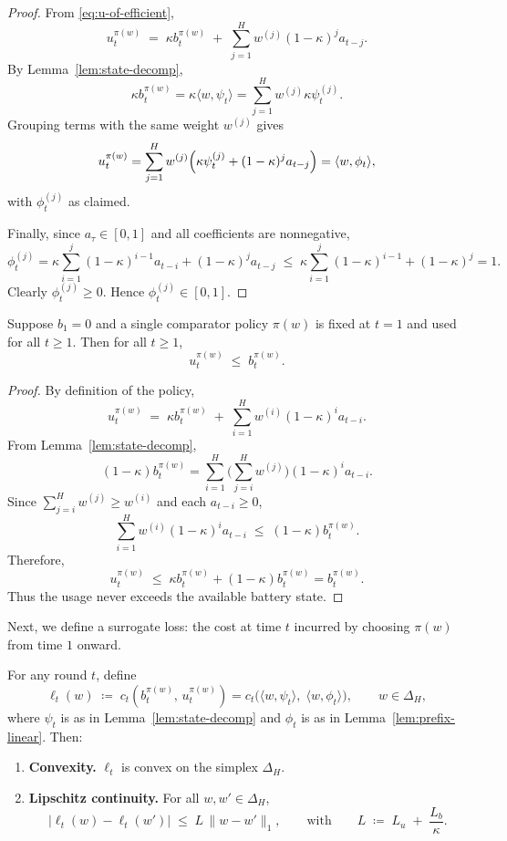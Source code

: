 \begin{proof}
From \eqref{eq:u-of-efficient},
\[
u_t^{\pi(w)} \;=\; \kappa b_t^{\pi(w)} \;+\; \sum_{j=1}^H w^{(j)} (1-\kappa)^j a_{t-j}.
\]
By Lemma~\ref{lem:state-decomp},
\[
\kappa b_t^{\pi(w)}
= \kappa\langle w,\psi_t\rangle
= \sum_{j=1}^H w^{(j)} \kappa \psi_t^{(j)}.
\]
Grouping terms with the same weight \(w^{(j)}\) gives
\[
u_t^{\pi(w)}
= \sum_{j=1}^H w^{(j)} \Bigl(\kappa \psi_t^{(j)} + (1-\kappa)^j a_{t-j}\Bigr)
= \langle w,\phi_t\rangle,
\]
with \(\phi_t^{(j)}\) as claimed.

Finally, since \(a_\tau \in [0,1]\) and all coefficients are nonnegative,
\[
\phi_t^{(j)}
= \kappa \sum_{i=1}^{j} (1-\kappa)^{i-1} a_{t-i} + (1-\kappa)^j a_{t-j}
\;\leq\;
\kappa \sum_{i=1}^{j} (1-\kappa)^{i-1} + (1-\kappa)^j
= 1.
\]
Clearly \(\phi_t^{(j)} \ge 0\). Hence \(\phi_t^{(j)}\in[0,1]\).
\end{proof}



\begin{Thm:Lemma}
\label{lem:feasible}
Suppose \(b_1=0\) and a single comparator policy \(\pi(w)\) is fixed at \(t=1\) and used for all \(t \ge 1\).  
Then for all \(t \ge 1\),
\[
u_t^{\pi(w)} \;\le\; b_t^{\pi(w)}.
\]
\end{Thm:Lemma}

\begin{proof}
By definition of the policy,
\[
u_t^{\pi(w)} \;=\; \kappa b_t^{\pi(w)} \;+\; \sum_{i=1}^H w^{(i)} (1-\kappa)^i a_{t-i}.
\]
From Lemma~\ref{lem:state-decomp},
\[
(1-\kappa)b_t^{\pi(w)} 
= \sum_{i=1}^H 
\Biggl(\sum_{j=i}^H w^{(j)}\Biggr) (1-\kappa)^i a_{t-i}.
\]
Since \(\sum_{j=i}^H w^{(j)} \ge w^{(i)}\) and each \(a_{t-i}\ge 0\),
\[
\sum_{i=1}^H w^{(i)} (1-\kappa)^i a_{t-i}
\;\le\; (1-\kappa)b_t^{\pi(w)}.
\]
Therefore,
\[
u_t^{\pi(w)}
\;\le\; \kappa b_t^{\pi(w)} + (1-\kappa)b_t^{\pi(w)}
= b_t^{\pi(w)}.
\]
Thus the usage never exceeds the available battery state.
\end{proof}



Next, we define a surrogate loss: the cost at time \(t\) incurred by choosing \(\pi(w)\) from time \(1\) onward.

\begin{Thm:Lemma}
\label{lem:surrogate-props}
For any round \(t\), define
\[
\ell_t(w) \;\coloneqq\; 
c_t\!\left(
b_t^{\pi(w)},\,u_t^{\pi(w)}\right)
=
c_t\!\big(\langle w,\psi_t\rangle,\;\langle w,\phi_t\rangle\big),
\qquad w\in\Delta_H,
\]
where \(\psi_t\) is as in Lemma~\ref{lem:state-decomp} and \(\phi_t\) is as in Lemma~\ref{lem:prefix-linear}. Then:
\begin{enumerate}
    \item \textbf{Convexity.} \(\ell_t\) is convex on the simplex \(\Delta_H\).
    \item \textbf{Lipschitz continuity.} For all \(w,w'\in\Delta_H\),
    \[
    |\ell_t(w)-\ell_t(w')| \;\le\; L\,\|w-w'\|_1,
    \qquad\text{with}\qquad
    L \;\coloneqq\; L_u \;+\; \frac{L_b}{\kappa}.
    \]
\end{enumerate}
\end{Thm:Lemma}

